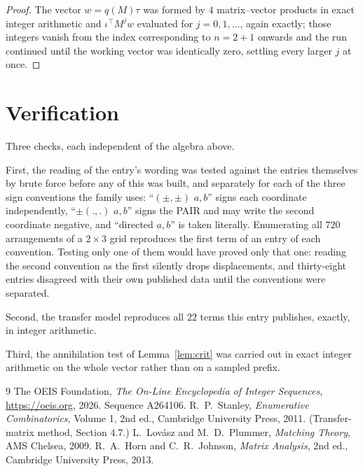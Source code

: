 \documentclass[11pt,a4paper]{article}
\theoremstyle{plain}
\theoremstyle{definition}
\begin{document}
\begin{proof}
The vector $w=q(M)\tau$ was formed by $4$ matrix--vector products in exact integer
arithmetic and $\iota^{\!\top}M^{j}w$ evaluated for $j=0,1,\dots$, again exactly; those
integers vanish from the index corresponding to $n=2+1$ onwards and the run continued
until the working vector was identically zero, settling every larger $j$ at once.
\end{proof}

\section{Verification}

Three checks, each independent of the algebra above.

First, the reading of the entry's wording was tested against the entries themselves by brute
force before any of this was built, and separately for each of the three sign conventions the
family uses: ``$(\pm,\pm)$ $a,b$'' signs each coordinate independently, ``$\pm(.,.)$ $a,b$''
signs the PAIR and may write the second coordinate negative, and ``directed $a,b$'' is taken
literally. Enumerating all $720$ arrangements of a $2\times3$ grid reproduces the first term
of an entry of each convention. Testing only one of them would have proved only that one:
reading the second convention as the first silently drops displacements, and thirty-eight
entries disagreed with their own published data until the conventions were separated.

Second, the transfer model reproduces all $22$ terms this entry publishes, exactly, in
integer arithmetic.

Third, the annihilation test of Lemma~\ref{lem:crit} was carried out in exact integer
arithmetic on the whole vector rather than on a sampled prefix.

\begin{thebibliography}{9}
 The OEIS Foundation, \emph{The On-Line Encyclopedia of Integer
Sequences}, \url{https://oeis.org}, 2026. Sequence A264106.
 R.~P.~Stanley, \emph{Enumerative Combinatorics}, Volume 1, 2nd ed.,
Cambridge University Press, 2011. (Transfer-matrix method, Section 4.7.)
 L.~Lov\'asz and M.~D.~Plummer, \emph{Matching Theory}, AMS Chelsea, 2009.
 R.~A.~Horn and C.~R.~Johnson, \emph{Matrix Analysis}, 2nd ed., Cambridge
University Press, 2013.
\end{thebibliography}
\end{document}
